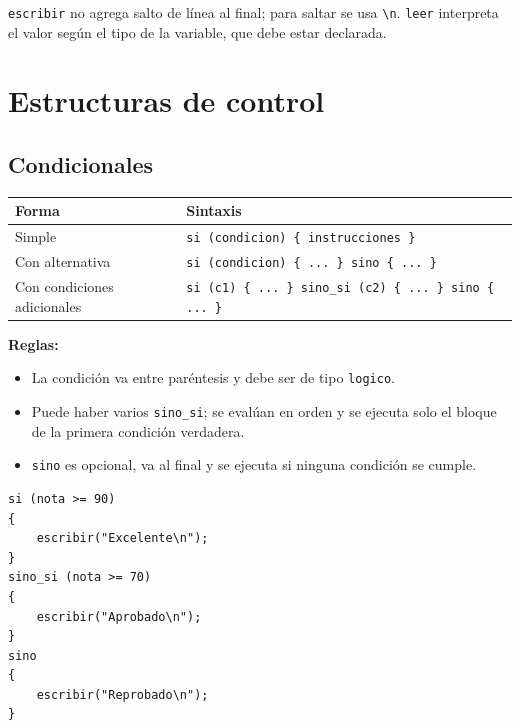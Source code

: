 \documentclass[spanish,11pt,letterpaper]{article}
\begin{document}
	\texttt{escribir} no agrega salto de l\'inea al final; para saltar se usa
	\texttt{\textbackslash n}. \texttt{leer} interpreta el valor seg\'un el tipo
	de la variable, que debe estar declarada.
	
	\newpage
	
	\section{Estructuras de control}
	\subsection{Condicionales}
	\begin{center}
		\begin{tabular}{@{}ll@{}}
			\toprule
			\textbf{Forma} & \textbf{Sintaxis} \\
			\midrule
			Simple & \texttt{si (condicion) \{ instrucciones \}} \\
			Con alternativa & \texttt{si (condicion) \{ ... \} sino \{ ... \}} \\
			Con condiciones adicionales & \texttt{si (c1) \{ ... \} sino\_si (c2) \{ ... \} sino \{ ... \}} \\
			\bottomrule
		\end{tabular}
	\end{center}
	
	\textbf{Reglas:}
	\begin{itemize}
		\item La condici\'on va entre par\'entesis y debe ser de tipo
		\texttt{logico}.
		\item Puede haber varios \texttt{sino\_si}; se eval\'uan en orden y se
		ejecuta solo el bloque de la primera condici\'on verdadera.
		\item \texttt{sino} es opcional, va al final y se ejecuta si ninguna
		condici\'on se cumple.
	\end{itemize}
	
	\begin{lstlisting}
si (nota >= 90)
{
	escribir("Excelente\n");
}
sino_si (nota >= 70)
{
	escribir("Aprobado\n");
}
sino
{
	escribir("Reprobado\n");
}
	\end{lstlisting}
	
\end{document}
